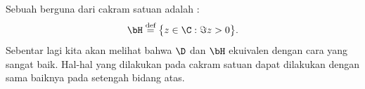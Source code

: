 
Sebuah  berguna dari cakram satuan adalah
\emph{}:
%
\begin{equation*}
\bH 
\overset{\text{def}}{=}
\bigl\{
z \in \C : \Im z > 0
\bigr\} .
\end{equation*}
Sebentar lagi kita akan melihat bahwa $\D$ dan $\bH$ ekuivalen dengan cara
yang sangat baik.
Hal-hal yang dilakukan pada cakram satuan dapat dilakukan dengan sama baiknya
pada setengah bidang atas.
